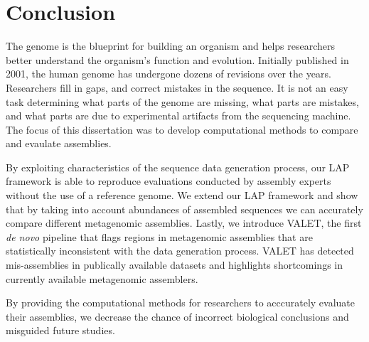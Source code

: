 
\renewcommand{\thechapter}{7}

\chapter{Conclusion}

The genome is the blueprint for building an organism and helps researchers better understand the organism's function and evolution.
Initially published in 2001, the human genome has undergone dozens of revisions over the years.
Researchers fill in gaps, and correct mistakes in the sequence.
It is not an easy task determining what parts of the genome are missing, what parts are mistakes, and what parts are due to experimental artifacts from the sequencing machine.
The focus of this dissertation was to develop computational methods to compare and evaulate assemblies.

By exploiting characteristics of the sequence data generation process, our LAP framework is able to reproduce evaluations conducted by assembly experts without the use of a reference genome.
We extend our LAP framework and show that by taking into account abundances of assembled sequences we can accurately compare different metagenomic assemblies.
Lastly, we introduce VALET, the first \emph{de novo} pipeline that flags regions in metagenomic assemblies that are statistically inconsistent with the data generation process.
VALET has detected mis-assemblies in publically available datasets and highlights shortcomings in currently available metagenomic assemblers.

By providing the computational methods for researchers to acccurately evaluate their assemblies, we decrease the chance of incorrect biological conclusions and misguided future studies.


